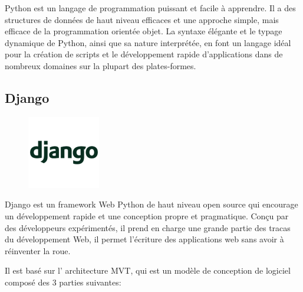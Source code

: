 Python est un langage de programmation puissant et facile à apprendre. Il a des 
structures de données de haut niveau efficaces et une approche simple, mais 
efficace de la programmation orientée objet. La syntaxe élégante et le typage 
dynamique de Python, ainsi que sa nature interprétée, en font un langage idéal 
pour la création de scripts et le développement rapide d’applications dans de 
nombreux domaines sur la plupart des plates-formes\cite{17}.
        
    
\subsection{Django}
    \begin{figure}
        \vspace{-22pt}
        \begin{center}
            \includegraphics[scale=0.5]{images/logo/django.png}
            \label{fig75}
        \end{center}
        \vspace{-20pt}
        \vspace{-10pt}
    \end{figure}

Django est un framework Web Python de haut niveau open source qui encourage un 
développement rapide et une conception propre et pragmatique. Conçu par des 
développeurs expérimentés, il prend en charge une grande partie des tracas du 
développement Web, il permet l'écriture des applications web sans avoir à 
réinventer la roue\cite{18}.
        
Il est basé sur l' architecture MVT, qui est un modèle de conception de logiciel 
composé des 3 parties suivantes:

